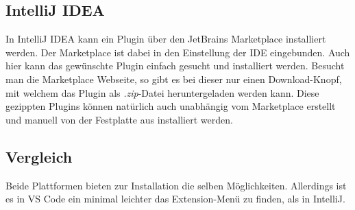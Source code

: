\subsection{IntelliJ IDEA}

In IntelliJ IDEA kann ein Plugin über den JetBrains Marketplace
installiert werden. Der Marketplace ist dabei in den Einstellung
der IDE eingebunden. Auch hier kann das gewünschte Plugin einfach
gesucht und installiert werden.
Besucht man die Marketplace Webseite, so gibt es bei dieser nur einen
Download-Knopf, mit welchem das Plugin als \emph{.zip}-Datei heruntergeladen
werden kann. Diese gezippten Plugins können natürlich auch
unabhängig vom Marketplace erstellt und manuell
von der Festplatte aus installiert werden.

\subsection{Vergleich}

Beide Plattformen bieten zur Installation die selben Möglichkeiten.
Allerdings ist es in VS Code ein minimal leichter das Extension-Menü
zu finden, als in IntelliJ.
